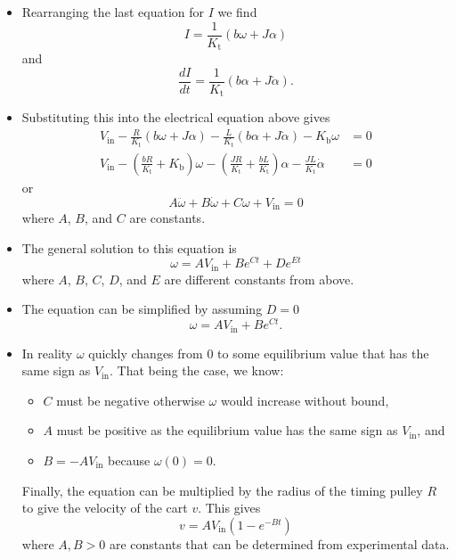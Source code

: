 \documentclass{article}
\begin{document}
\begin{itemize}
  \item Rearranging the last equation for $I$ we find \[I = \frac{1}{K_\text{t}} (b \omega + J \alpha)\] and \[\frac{d I}{d t} = \frac{1}{K_\text{t}} (b \alpha + J \dot{\alpha}).\]

  \item Substituting this into the electrical equation above gives \begin{align*}
          V_\text{in} - \frac{R}{K_\text{t}} (b \omega + J \alpha) - \frac{L}{K_\text{t}} (b \alpha + J \dot{\alpha}) - K_\text{b} \omega                                                       & = 0 \\
          V_\text{in} - \left( \frac{b R}{K_\text{t}} + K_\text{b} \right) \omega - \left( \frac{J R}{K_\text{t}} + \frac{b L}{K_\text{t}} \right) \alpha - \frac{J L}{K_\text{t}} \dot{\alpha} & = 0
        \end{align*} or \[A \ddot{\omega} + B \dot{\omega} + C \omega + V_\text{in} = 0\] where $A$, $B$, and $C$ are constants.

  \item The general solution to this equation is \[\omega = A V_\text{in} + B e^{C t} + D e^{E t}\] where $A$, $B$, $C$, $D$, and $E$ are different constants from above.

  \item The equation can be simplified by assuming $D = 0$ \[\omega = A V_\text{in} + B e^{C t}.\]

  \item In reality $\omega$ quickly changes from $0$ to some equilibrium value that has the same sign as $V_\text{in}$. That being the case, we know:

        \begin{itemize}
          \item $C$ must be negative otherwise $\omega$ would increase without bound,

          \item $A$ must be positive as the equilibrium value has the same sign as $V_\text{in}$, and

          \item $B = -A V_\text{in}$ because $\omega(0) = 0$.
        \end{itemize}

        Finally, the equation can be multiplied by the radius of the timing pulley $R$ to give the velocity of the cart $v$. This gives \[v = A V_\text{in} (1 - e^{-B t})\] where $A, B > 0$ are constants that can be determined from experimental data.


\end{itemize}
\end{document}
